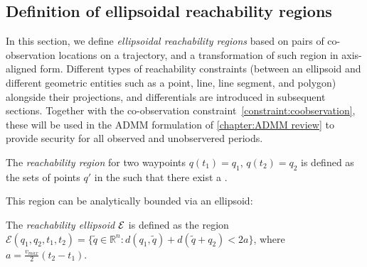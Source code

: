 \documentclass[10pt,twocolumn,twoside]{IEEEtran}
\begin{document}
\subsection{Definition of ellipsoidal reachability regions}\label{sec:reachability}
In this section, we define \emph{ellipsoidal reachability regions} based on pairs of co-observation locations on a trajectory, and a transformation of such region in axis-aligned form. Different types of reachability constraints (between an ellipsoid and different geometric entities such as a point, line, line segment, and polygon) alongside their projections, and differentials are introduced in subsequent sections. Together with the co-observation constraint~\ref{constraint:coobservation}, these will be used in the ADMM formulation of \cref{chapter:ADMM review} to provide security for all observed and unobservered periods.


\begin{definition}\label{sec:ellipsoidal definition}
	The \emph{reachability region} for two waypoints $q(t_1)=q_1$, $q(t_2)=q_2$ is defined as the sets of points $q'$ in the  such that there exist a . 
\end{definition}
This region can be analytically bounded via an ellipsoid:
\begin{definition}\label{def:Reachability}
	The \emph{reachability ellipsoid $\mathcal{E}$} is defined as the region  $\mathcal{E}(q_1,q_2,t_{1},t_{2})=\{\tilde{q}\in\mathbb{R}^n: d(q_1,\tilde{q})+d(\tilde{q}+q_2)<2a\}$, where $a=\frac{v_{max}}{2}(t_2-t_1)$.
\end{definition}
\end{document}
